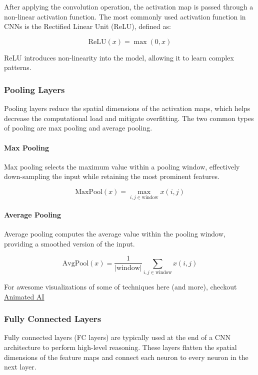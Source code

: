\documentclass[12pt]{article}
\begin{document}
After applying the convolution operation, the activation map is passed through a non-linear activation function. The most commonly used activation function in CNNs is the Rectified Linear Unit (ReLU), defined as:

\[
\text{ReLU}(x) = \max(0, x)
\]

ReLU introduces non-linearity into the model, allowing it to learn complex patterns.

\subsubsection{Pooling Layers}

Pooling layers reduce the spatial dimensions of the activation maps, which helps decrease the computational load and mitigate overfitting. The two common types of pooling are max pooling and average pooling.

\paragraph{Max Pooling}

Max pooling selects the maximum value within a pooling window, effectively down-sampling the input while retaining the most prominent features.

\[
\text{MaxPool}(x) = \max_{i, j \in \text{window}} x(i, j)
\]

\paragraph{Average Pooling}

Average pooling computes the average value within the pooling window, providing a smoothed version of the input.

\[
\text{AvgPool}(x) = \frac{1}{|\text{window}|} \sum_{i, j \in \text{window}} x(i, j)
\]

For awesome visualizations of some of techniques here (and more), checkout \href{https://animatedai.github.io/}{Animated AI}

\subsubsection{Fully Connected Layers}

Fully connected layers (FC layers) are typically used at the end of a CNN architecture to perform high-level reasoning. These layers flatten the spatial dimensions of the feature maps and connect each neuron to every neuron in the next layer.
\end{document}

